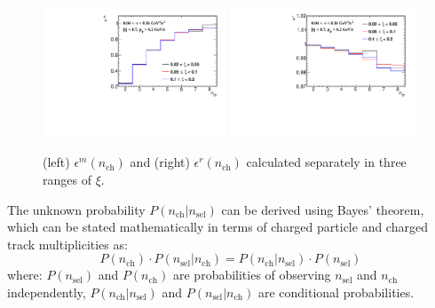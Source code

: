 \begin{figure}[h!]
	\centering
	\includegraphics[width=0.49\textwidth,page=1]{chapters/chrgSTAR/img/unfolding/correction_0.pdf}
	\includegraphics[width=0.49\textwidth,page=1]{chapters/chrgSTAR/img/unfolding/correction_1.pdf}
	\caption{(left) $\epsilon^{m}(n_\textrm{ch})$  and (right) $\epsilon^{r}(n_\textrm{ch})$ calculated separately in three ranges of $\xi$.}
	\label{fig:correctionSTAR}
\end{figure}

\noindent The unknown probability $P(n_\textrm{ch}|n_\textrm{sel})$ can be derived using Bayes' theorem, which can be stated mathematically in terms of charged particle and charged track multiplicities as:
\begin{equation}
P\left(n_\textrm{ch}\right)\cdot P\left(n_\textrm{sel}|n_\textrm{ch}\right) = P\left(n_\textrm{ch}|n_\textrm{sel}\right)\cdot P\left(n_\textrm{sel}\right)
\end{equation}
where: $P(n_\textrm{sel})$ and $P(n_\textrm{ch})$ are probabilities of observing $n_\textrm{sel}$ and $n_\textrm{ch}$ independently, $P(n_\textrm{ch}|n_\textrm{sel})$ and $P(n_\textrm{sel}|n_\textrm{ch})$ are conditional probabilities.
 

